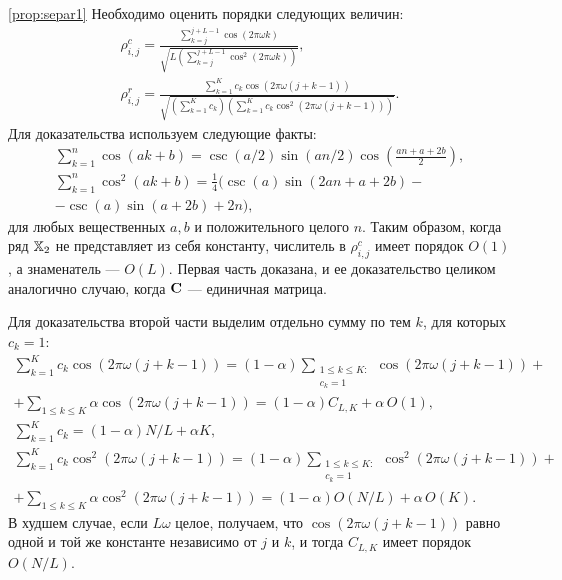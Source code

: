 \documentclass[12pt,a4paper,fleqn,leqno]{article}
\begin{document}
\begin{proof5}{\ref{prop:separ1}}
Необходимо оценить порядки следующих величин:
\begin{gather*}
\rho^c_{i,j} = \frac{\sum_{k=j}^{j + L - 1} \cos(2 \pi \omega k)}{\sqrt{L (\sum_{k=j}^{j + L - 1} \cos^2(2 \pi \omega k))}},\\ \rho^r_{i,j} = \frac{\sum_{k=1}^K c_k\cos(2 \pi \omega (j + k - 1))}{\sqrt{(\sum_{k=1}^K c_k) (\sum_{k=1}^K c_k\cos^2(2 \pi \omega (j + k - 1)))}}.
\end{gather*}
Для доказательства используем следующие факты:
\begin{gather*}
\sum_{k=1}^n \cos(ak + b) = \csc(a/2) \sin(an / 2) \cos \left(\frac{an + a + 2b}{2} \right), \\
\sum_{k=1}^n \cos^2(ak + b) = \frac{1}{4}(\csc(a) \sin(2an + a + 2b) -\\ - \csc(a)\sin(a + 2b) + 2n),
\end{gather*}
для любых вещественных $a, b$ и положительного целого $n$.
Таким образом, когда ряд $\mathbb{X}_2$ не представляет из себя константу, числитель в $\rho^c_{i,j}$ имеет порядок $O(1)$, а знаменатель --- $O(L)$.
Первая часть доказана, и ее доказательство целиком аналогично случаю, когда $\mathbf{C}$ --- единичная матрица.

Для доказательства второй части выделим отдельно сумму по тем $k$, для которых $c_k=1$:
\begin{gather*}
\sum_{k=1}^K c_k\cos(2 \pi \omega (j + k - 1)) = (1-\alpha) \sum_{\substack{1 \le k \le K: \\ c_k = 1}}\cos(2 \pi \omega (j + k - 1)) +\\ +\sum_{1 \le k \le K}\alpha \cos(2 \pi \omega (j + k - 1)) = (1-\alpha) C_{L,K} + \alpha\, O(1),
\\
\sum_{k=1}^K c_k = (1-\alpha) N/L + \alpha K,
\\
\sum_{k=1}^K c_k\cos^2(2 \pi \omega (j + k - 1)) = (1-\alpha)\sum_{\substack{1 \le k \le K: \\ c_k = 1}}\cos^2(2 \pi \omega (j + k - 1)) +\\ +\sum_{1 \le k \le K }\alpha \cos^2(2 \pi \omega (j + k - 1)) = (1-\alpha) O(N/L) + \alpha\, O(K).
\end{gather*}
В худшем случае, если $L\omega$ целое, получаем, что $\cos(2 \pi \omega (j + k - 1))$ равно одной и той же константе независимо от $j$ и $k$, и тогда $C_{L,K}$ имеет порядок $O(N/L)$.
\end{proof5}
\end{document}
